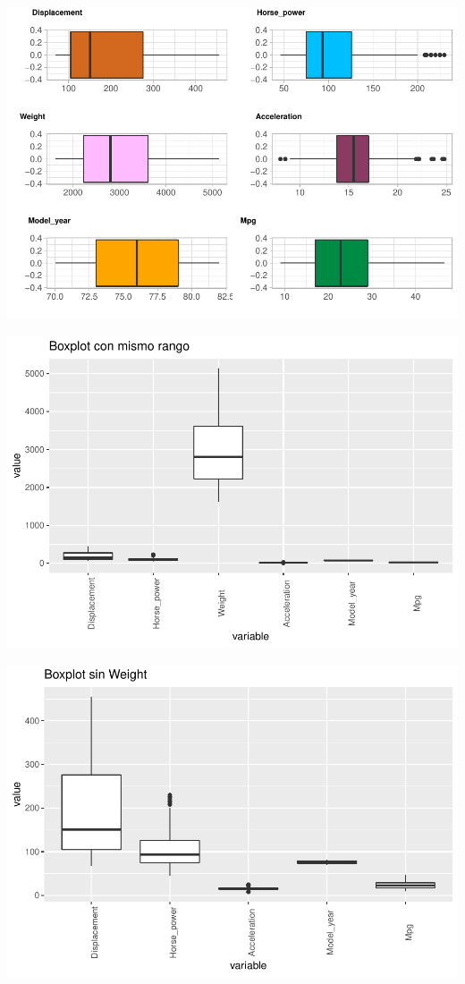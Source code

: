 \begin{center}\includegraphics{img/EDA_files/figure-latex/unnamed-chunk-8-7} \end{center}
\begin{center}\includegraphics{img/EDA_files/figure-latex/unnamed-chunk-9-1} \end{center}
\begin{center}\includegraphics{img/EDA_files/figure-latex/unnamed-chunk-9-2} \end{center}

